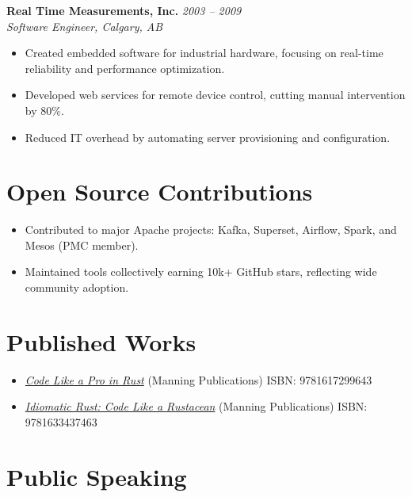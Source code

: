 \documentclass[margin,line]{resume}
\begin{document}
\begin{resume}
\filbreak
\textbf{Real Time Measurements, Inc.} \hfill \textit{2003 -- 2009}\\
\textit{Software Engineer, Calgary, AB}

\begin{itemize}
    \item Created embedded software for industrial hardware, focusing on real-time reliability and performance optimization.
    \item Developed web services for remote device control, cutting manual intervention by 80\%.
    \item Reduced IT overhead by automating server provisioning and configuration.
\end{itemize}

\vspace{10pt}

\section{Open Source Contributions}

\begin{itemize}[nosep]
    \item Contributed to major Apache projects: Kafka, Superset, Airflow, Spark, and Mesos (PMC member).
    \item Maintained tools collectively earning 10k+ GitHub stars, reflecting wide community adoption.
\end{itemize}

\vspace{10pt}

\section{Published Works}

\begin{itemize}[nosep]
    \item \href{https://www.manning.com/books/code-like-a-pro-in-rust}{\textit{Code Like a Pro in Rust}} (Manning Publications) \hfill ISBN: 9781617299643
    \item \href{https://www.manning.com/books/idiomatic-rust}{\textit{Idiomatic Rust: Code Like a Rustacean}} (Manning Publications) \hfill ISBN: 9781633437463
\end{itemize}

\vspace{10pt}

\section{Public Speaking}


\end{resume}
\end{document}
